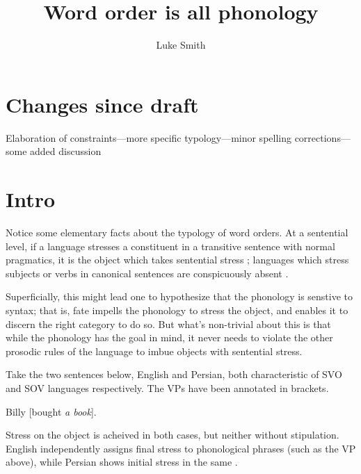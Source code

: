 \documentclass{article}
\title{Word order is all phonology}
\author{Luke Smith}
\begin{document}
\maketitle

\section*{Changes since draft}

Elaboration of constraints---more specific typology---minor spelling corrections---some added discussion

\section{Intro}

Notice some elementary facts about the typology of word orders. At a sentential level, if a language stresses a constituent in a transitive sentence with normal pragmatics, it is the object which takes sentential stress \parencite{gundel88}; languages which stress subjects or verbs in canonical sentences are conspicuously absent \parencite{kahnemuyipour05}.

Superficially, this might lead one to hypothesize that the phonology is senstive to syntax; that is, fate impells the phonology to stress the object, and enables it to discern the right category to do so. But what's non-trivial about this is that while the phonology has the goal in mind, it never needs to violate the other prosodic rules of the language to imbue objects with sentential stress.

Take the two sentences below, English and Persian, both characteristic of SVO and SOV languages respectively. The VPs have been annotated in brackets.

\begin{exe}
\ex 
\begin{xlist}
\ex Billy [bought \emph{a book}].
\end{xlist}
\end{exe}

Stress on the object is acheived in both cases, but neither without stipulation. English independently assigns final stress to phonological phrases (such as the VP above), while Persian shows initial stress in the same \parencite{kahnemuyipour03,kahnemuyipour05}.
\end{document}
